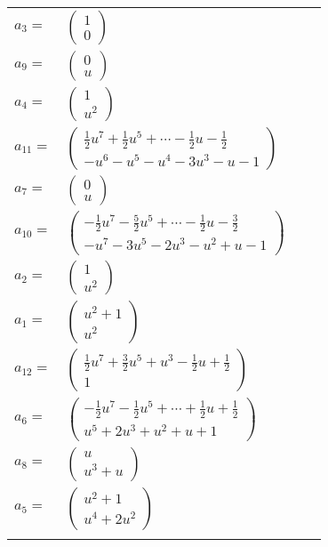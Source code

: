 \documentclass[1p]{elsarticle_modified}
\theoremstyle{definition}
\begin{document}
\begin{tabular}{m{7pt} m{180pt} m{7pt} m{180pt} }
\flushright $a_{3}=$&$\begin{pmatrix}1\\0\end{pmatrix}$ \\
\flushright $a_{9}=$&$\begin{pmatrix}0\\u\end{pmatrix}$ \\
\flushright $a_{4}=$&$\begin{pmatrix}1\\u^2\end{pmatrix}$ \\
\flushright $a_{11}=$&$\begin{pmatrix}\frac{1}{2} u^7+\frac{1}{2} u^5+\cdots-\frac{1}{2} u-\frac{1}{2}\\- u^6- u^5- u^4-3 u^3- u-1\end{pmatrix}$ \\
\flushright $a_{7}=$&$\begin{pmatrix}0\\u\end{pmatrix}$ \\
\flushright $a_{10}=$&$\begin{pmatrix}-\frac{1}{2} u^7-\frac{5}{2} u^5+\cdots-\frac{1}{2} u-\frac{3}{2}\\- u^7-3 u^5-2 u^3- u^2+u-1\end{pmatrix}$ \\
\flushright $a_{2}=$&$\begin{pmatrix}1\\u^2\end{pmatrix}$ \\
\flushright $a_{1}=$&$\begin{pmatrix}u^2+1\\u^2\end{pmatrix}$ \\
\flushright $a_{12}=$&$\begin{pmatrix}\frac{1}{2} u^7+\frac{3}{2} u^5+u^3-\frac{1}{2} u+\frac{1}{2}\\1\end{pmatrix}$ \\
\flushright $a_{6}=$&$\begin{pmatrix}-\frac{1}{2} u^7-\frac{1}{2} u^5+\cdots+\frac{1}{2} u+\frac{1}{2}\\u^5+2 u^3+u^2+u+1\end{pmatrix}$ \\
\flushright $a_{8}=$&$\begin{pmatrix}u\\u^3+u\end{pmatrix}$ \\
\flushright $a_{5}=$&$\begin{pmatrix}u^2+1\\u^4+2 u^2\end{pmatrix}$\\&\end{tabular}
\end{document}
